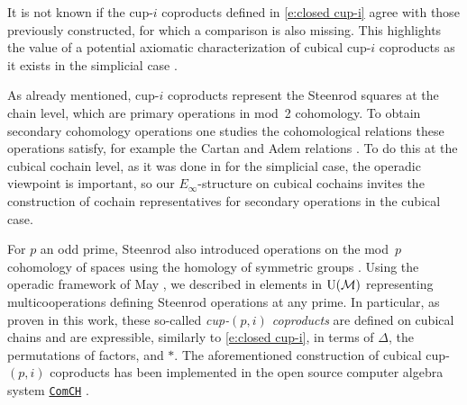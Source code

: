 It is not known if the cup-$i$ coproducts defined in \cref{e:closed cup-i} agree with those previously constructed, for which a comparison is also missing.
This highlights the value of a potential axiomatic characterization of cubical cup-$i$ coproducts as it exists in the simplicial case \cite{medina2022axiomatic}.

As already mentioned, cup-$i$ coproducts represent the Steenrod squares at the chain level,
which are primary operations in mod~2 cohomology.
To obtain secondary cohomology operations one studies the cohomological relations these operations satisfy, for example the Cartan and Adem relations \cite{steenrod1962cohomology}.
To do this at the cubical cochain level, as it was done in \cite{medina2020cartan,medina2021adem} for the simplicial case, the operadic viewpoint is important, so our $E_\infty$-structure on cubical cochains invites the construction of cochain representatives for secondary operations in the cubical case.

For $p$ an odd prime, Steenrod also introduced operations on the mod~$p$ cohomology of spaces using the homology of symmetric groups \cite{steenrod1952reduced, steenrod1953cyclic}.
Using the operadic framework of May \cite{may1970general}, we described in \cite{medina2021may_st} elements in ${\operatorname{U}(\mathcal{M})}$ representing multicooperations defining Steenrod operations at any prime.
In particular, as proven in this work, these so-called \textit{cup-$(p,i)$ coproducts} are defined on cubical chains and are expressible, similarly to \cref{e:closed cup-i}, in terms of $\Delta$, the permutations of factors, and $\ast$.
The aforementioned construction of cubical cup-$(p,i)$ coproducts has been implemented in the open source computer algebra system \href{https://comch.readthedocs.io/en/latest/}{\texttt{ComCH}} \cite{medina2021comch}.
